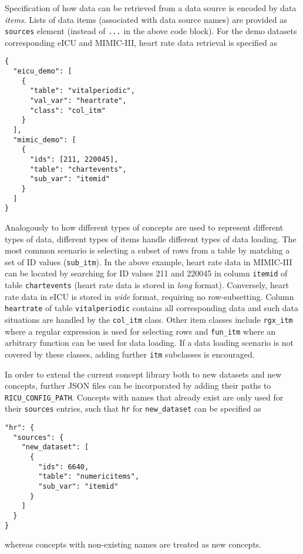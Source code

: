 \documentclass[
  notitle]{jss}
\begin{document}
Specification of how data can be retrieved from a data source is encoded
by data \emph{items}. Lists of data items (associated with data source
names) are provided as \texttt{sources} element (instead of \texttt{...}
in the above code block). For the demo datasets corresponding eICU and
MIMIC-III, heart rate data retrieval is specified as

\begin{verbatim}
{
  "eicu_demo": [
    {
      "table": "vitalperiodic",
      "val_var": "heartrate",
      "class": "col_itm"
    }
  ],
  "mimic_demo": [
    {
      "ids": [211, 220045],
      "table": "chartevents",
      "sub_var": "itemid"
    }
  ]
}
\end{verbatim}

Analogously to how different types of concepts are used to represent
different types of data, different types of items handle different types
of data loading. The most common scenario is selecting a subset of rows
from a table by matching a set of ID values (\texttt{sub\_itm}). In the
above example, heart rate data in MIMIC-III can be located by searching
for ID values 211 and 220045 in column \texttt{itemid} of table
\texttt{chartevents} (heart rate data is stored in \emph{long} format).
Conversely, heart rate data in eICU is stored in \emph{wide} format,
requiring no row-subsetting. Column \texttt{heartrate} of table
\texttt{vitalperiodic} contains all corresponding data and such data
situations are handled by the \texttt{col\_itm} class. Other item
classes include \texttt{rgx\_itm} where a regular expression is used for
selecting rows and \texttt{fun\_itm} where an arbitrary function can be
used for data loading. If a data loading scenario is not covered by
these classes, adding further \texttt{itm} subclasses is encouraged.

In order to extend the current concept library both to new datasets and
new concepts, further JSON files can be incorporated by adding their
paths to \texttt{RICU\_CONFIG\_PATH}. Concepts with names that already
exist are only used for their \texttt{sources} entries, such that
\texttt{hr} for \texttt{new\_dataset} can be specified as

\begin{verbatim}
"hr": {
  "sources": {
    "new_dataset": [
      {
        "ids": 6640,
        "table": "numericitems",
        "sub_var": "itemid"
      }
    ]
  }
}
\end{verbatim}

whereas concepts with non-existing names are treated as new concepts.
\end{document}
